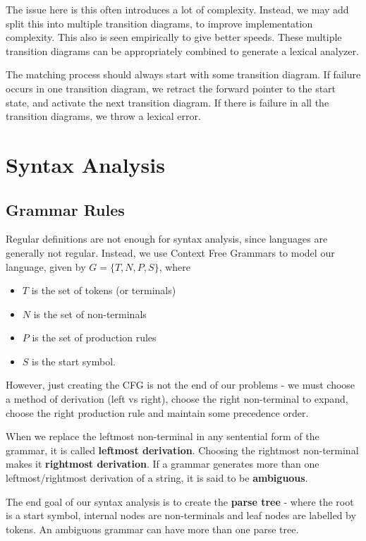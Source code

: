 \documentclass[12pt,letterpaper]{amsbook}
\theoremstyle{definition}
\begin{document}
The issue here is this often introduces a lot of complexity. Instead, we may add split this into multiple transition diagrams, to improve implementation complexity. This also is seen empirically to give better speeds. These multiple transition diagrams can be appropriately combined to generate a lexical analyzer.

The matching process should always start with some transition diagram. If failure occurs in one transition diagram, we retract the forward pointer to the start state, and activate the next transition diagram. If there is failure in all the transition diagrams, we throw a lexical error.

\chapter{Syntax Analysis}

\section{Grammar Rules}

Regular definitions are not enough for syntax analysis, since languages are generally not regular. Instead, we use Context Free Grammars to model our language, given by $G = \{T,N,P,S\}$, where

\begin{itemize}
  \item $T$ is the set of tokens (or terminals)
  \item $N$ is the set of non-terminals
  \item $P$ is the set of production rules
  \item $S$ is the start symbol.
\end{itemize}

However, just creating the CFG is not the end of our problems - we must choose a method of derivation (left vs right), choose the right non-terminal to expand, choose the right production rule and maintain some precedence order.

When we replace the leftmost non-terminal in any sentential form of the grammar, it is called \textbf{leftmost derivation}. Choosing the rightmost non-terminal makes it \textbf{rightmost derivation}. If a grammar generates more than one leftmost/rightmost derivation of a string, it is said to be \textbf{ambiguous}.

The end goal of our syntax analysis is to create the \textbf{parse tree} - where the root is a start symbol, internal nodes are non-terminals and leaf nodes are labelled by tokens. An ambiguous grammar can have more than one parse tree.
\end{document}
